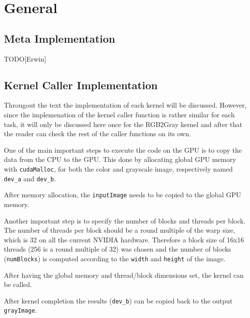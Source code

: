 \documentclass[final]{report}
\begin{document}
\chapter{General}

\section{Meta Implementation}
TODO[Erwin]

\section{Kernel Caller Implementation}
Througout the text the implementation of each kernel will be discussed.
However, since the implemenation of the kernel caller function is rather similar for each task, it will only be discussed here once for the RGB2Gray kernel and after that the reader can check the rest of the caller functions on its own.

One of the main important steps to execute the code on the GPU is to copy the data from the CPU to the GPU.
This done by allocating global GPU memory with \texttt{cudaMalloc}, for both the color and grayscale image, respectively named \texttt{dev\_a} and \texttt{dev\_b}.

After memory allocation, the \texttt{inputImage} needs to be copied to the global GPU memory.


Another important step is to specify the number of blocks and threads per block.
The number of threads per block should be a round multiple of the warp size, which is 32 on all the current NVIDIA hardware.
Therefore a block size of 16x16 threads (256 is a round multiple of 32) was chosen and the number of blocks (\texttt{numBlocks}) is computed according to the \texttt{width} and \texttt{height} of the image.


After having the global memory and thread/block dimensions set, the kernel can be called.


After kernel completion the results (\texttt{dev\_b}) can be copied back to the output \texttt{grayImage}.

\end{document}
